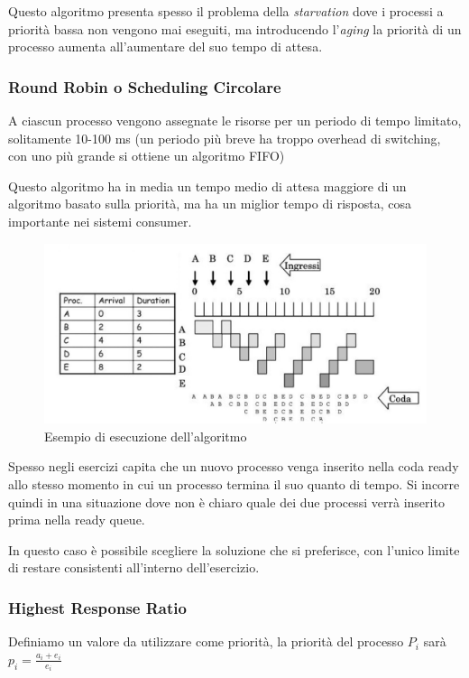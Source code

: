 Questo algoritmo presenta spesso il problema della \textit{starvation} dove i processi a priorità bassa non vengono mai eseguiti, ma introducendo l'\textit{aging} la priorità di un processo aumenta all'aumentare del suo tempo di attesa.

\subsubsection{Round Robin o Scheduling Circolare}
A ciascun processo vengono assegnate le risorse per un periodo di tempo limitato, solitamente 10-100 ms (un periodo più breve ha troppo overhead di switching, con uno più grande si ottiene un algoritmo FIFO)

Questo algoritmo ha in media un tempo medio di attesa maggiore di un algoritmo basato sulla priorità, ma ha un miglior tempo di risposta, cosa importante nei sistemi consumer.

\begin{figure}[H]
    \centering
    \includegraphics[width=0.65\linewidth]{assets/round-robin.jpg}
    \caption{Esempio di esecuzione dell'algoritmo}
\end{figure}

\begin{note}
    Spesso negli esercizi capita che un nuovo processo venga inserito nella coda ready allo stesso momento in cui un processo termina il suo quanto di tempo. Si incorre quindi in una situazione dove non è chiaro quale dei due processi verrà inserito prima nella ready queue.

    In questo caso è possibile scegliere la soluzione che si preferisce, con l'unico limite di restare consistenti all'interno dell'esercizio.
\end{note}

\subsubsection{Highest Response Ratio}
Definiamo un valore da utilizzare come priorità, la priorità del processo $P_i$ sarà $p_i = \frac{a_i + e_i}{e_i}$

